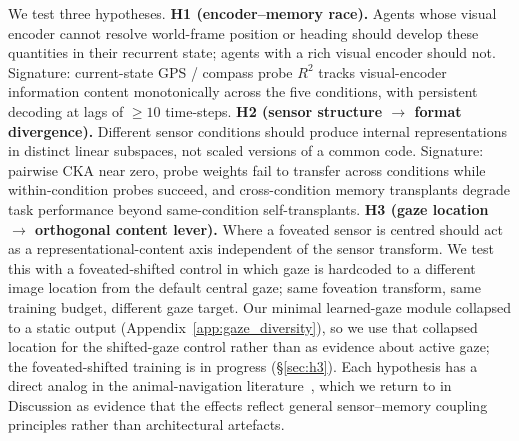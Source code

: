 \documentclass{article}
\begin{document}
We test three hypotheses. \textbf{H1 (encoder--memory race).} Agents whose visual encoder cannot resolve world-frame position or heading should develop these quantities in their recurrent state; agents with a rich visual encoder should not. Signature: current-state GPS / compass probe $R^2$ tracks visual-encoder information content monotonically across the five conditions, with persistent decoding at lags of $\geq 10$ time-steps. \textbf{H2 (sensor structure $\to$ format divergence).} Different sensor conditions should produce internal representations in distinct linear subspaces, not scaled versions of a common code. Signature: pairwise CKA near zero, probe weights fail to transfer across conditions while within-condition probes succeed, and cross-condition memory transplants degrade task performance beyond same-condition self-transplants. \textbf{H3 (gaze location $\to$ orthogonal content lever).} Where a foveated sensor is centred should act as a representational-content axis independent of the sensor transform. We test this with a foveated-shifted control in which gaze is hardcoded to a different image location from the default central gaze; same foveation transform, same training budget, different gaze target. Our minimal learned-gaze module collapsed to a static output (Appendix~\ref{app:gaze_diversity}), so we use that collapsed location for the shifted-gaze control rather than as evidence about active gaze; the foveated-shifted training is in progress (§\ref{sec:h3}). Each hypothesis has a direct analog in the animal-navigation literature~\citep{kupers2014blind,chen2016grid,geva2016remapping,jutras2013saccades,najemnik2005optimal}, which we return to in Discussion as evidence that the effects reflect general sensor--memory coupling principles rather than architectural artefacts.
\end{document}
